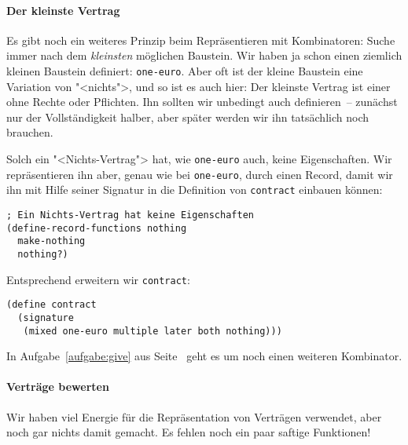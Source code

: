 \paragraph{Der kleinste Vertrag}

Es gibt noch ein weiteres Prinzip beim Repräsentieren mit
Kombinatoren: Suche immer nach dem \emph{kleinsten} möglichen
Baustein.  Wir haben ja schon einen ziemlich kleinen Baustein
definiert: \lstinline{one-euro}.  Aber oft ist der kleine Baustein
eine Variation von "<nichts">, und so ist es auch hier: Der kleinste
Vertrag ist einer ohne Rechte oder Pflichten.  Ihn sollten wir
unbedingt auch definieren~-- zunächst nur der Vollständigkeit halber,
aber später werden wir ihn tatsächlich noch brauchen.

Solch ein "<Nichts-Vertrag"> hat, wie \lstinline{one-euro} auch, keine
Eigenschaften.  Wir repräsentieren ihn aber, genau wie bei
\lstinline{one-euro}, durch einen Record, damit wir ihn mit Hilfe
seiner Signatur in die Definition von \lstinline{contract} einbauen
können:
%
\begin{lstlisting}
; Ein Nichts-Vertrag hat keine Eigenschaften
(define-record-functions nothing
  make-nothing
  nothing?)
\end{lstlisting}
%
Entsprechend erweitern wir \lstinline{contract}:
%
\begin{lstlisting}
(define contract
  (signature
   (mixed one-euro multiple later both nothing)))
\end{lstlisting}
%
In Aufgabe~\ref{aufgabe:give} aus Seite~\pageref{aufgabe:give} geht es
um noch einen weiteren Kombinator.

\paragraph{Verträge bewerten}

Wir haben viel Energie für die Repräsentation von Verträgen verwendet,
aber noch gar nichts damit gemacht.  Es fehlen noch ein paar saftige
Funktionen!

